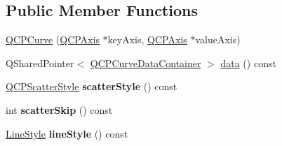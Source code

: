 \subsection*{Public Member Functions}
\begin{DoxyCompactItemize}
\item 
\hyperlink{classQCPCurve_a36de58e2652b3fa47bdf9187d421d3ce}{Q\+C\+P\+Curve} (\hyperlink{classQCPAxis}{Q\+C\+P\+Axis} $\ast$key\+Axis, \hyperlink{classQCPAxis}{Q\+C\+P\+Axis} $\ast$value\+Axis)
\item 
Q\+Shared\+Pointer$<$ \hyperlink{classQCPDataContainer}{Q\+C\+P\+Curve\+Data\+Container} $>$ \hyperlink{classQCPCurve_ad89c71fdd1726506c21c0cc471547368}{data} () const 
\item 
\hyperlink{classQCPScatterStyle}{Q\+C\+P\+Scatter\+Style} {\bfseries scatter\+Style} () const \hypertarget{classQCPCurve_a9ab864c9f6ba0cedf65853f59d867a68}{}\label{classQCPCurve_a9ab864c9f6ba0cedf65853f59d867a68}

\item 
int {\bfseries scatter\+Skip} () const \hypertarget{classQCPCurve_a3f79b67a8e6bd7d30403d802d39bbcf0}{}\label{classQCPCurve_a3f79b67a8e6bd7d30403d802d39bbcf0}

\item 
\hyperlink{classQCPCurve_a2710e9f79302152cff794c6e16cc01f1}{Line\+Style} {\bfseries line\+Style} () const \hypertarget{classQCPCurve_a0314dd644258949aeb4a95cebde5abaf}{}\label{classQCPCurve_a0314dd644258949aeb4a95cebde5abaf}


\end{DoxyCompactItemize}
